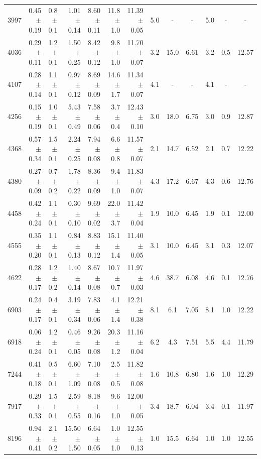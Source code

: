 \begin{table}
{\begin{tabular}{|r |r |r |r r |r r |c c c |c c c|}
 3997 & 0.45 $\pm$ 0.19 & 0.8 $\pm$ 0.1 &  1.01 $\pm$ 0.14 & 8.60 $\pm$ 0.11 & 11.8 $\pm$ 1.0 & 11.39 $\pm$ 0.05 & 5.0 &    - &    - & 5.0 &    - &     - \\
 4036 & 0.29 $\pm$ 0.11 & 1.2 $\pm$ 0.1 &  1.50 $\pm$ 0.25 & 8.42 $\pm$ 0.12 &  9.8 $\pm$ 1.0 & 11.70 $\pm$ 0.07 & 3.2 & 15.0 & 6.61 & 3.2 &  0.5 & 12.57 \\
 4107 & 0.28 $\pm$ 0.14 & 1.1 $\pm$ 0.1 &  0.97 $\pm$ 0.12 & 8.69 $\pm$ 0.09 & 14.6 $\pm$ 1.7 & 11.34 $\pm$ 0.07 & 4.1 &    - &    - & 4.1 &    - &     - \\
 4256 & 0.15 $\pm$ 0.19 & 1.0 $\pm$ 0.1 &  5.43 $\pm$ 0.49 & 7.58 $\pm$ 0.06 &  3.7 $\pm$ 0.4 & 12.43 $\pm$ 0.10 & 3.0 & 18.0 & 6.75 & 3.0 &  0.9 & 12.87 \\
 4368 & 0.57 $\pm$ 0.34 & 1.5 $\pm$ 0.1 &  2.24 $\pm$ 0.25 & 7.94 $\pm$ 0.08 &  6.6 $\pm$ 0.8 & 11.57 $\pm$ 0.07 & 2.1 & 14.7 & 6.52 & 2.1 &  0.7 & 12.22 \\
 4380 & 0.27 $\pm$ 0.09 & 0.7 $\pm$ 0.2 &  1.78 $\pm$ 0.22 & 8.36 $\pm$ 0.09 &  9.4 $\pm$ 1.0 & 11.83 $\pm$ 0.07 & 4.3 & 17.2 & 6.67 & 4.3 &  0.6 & 12.76 \\
 4458 & 0.42 $\pm$ 0.24 & 1.1 $\pm$ 0.1 &  0.30 $\pm$ 0.10 & 9.69 $\pm$ 0.02 & 22.0 $\pm$ 3.7 & 11.42 $\pm$ 0.04 & 1.9 & 10.0 & 6.45 & 1.9 &  0.1 & 12.00 \\
 4555 & 0.35 $\pm$ 0.20 & 1.1 $\pm$ 0.1 &  0.84 $\pm$ 0.13 & 8.83 $\pm$ 0.12 & 15.1 $\pm$ 1.4 & 11.40 $\pm$ 0.05 & 3.1 & 10.0 & 6.45 & 3.1 &  0.3 & 12.07 \\
 4622 & 0.28 $\pm$ 0.17 & 1.2 $\pm$ 0.2 &  1.40 $\pm$ 0.14 & 8.67 $\pm$ 0.08 & 10.7 $\pm$ 0.7 & 11.97 $\pm$ 0.03 & 4.6 & 38.7 & 6.08 & 4.6 &  0.1 & 12.76 \\
 6903 & 0.24 $\pm$ 0.17 & 0.4 $\pm$ 0.1 &  3.19 $\pm$ 0.34 & 7.83 $\pm$ 0.06 &  4.1 $\pm$ 1.4 & 12.21 $\pm$ 0.38 & 8.1 &  6.1 & 7.05 & 8.1 &  1.0 & 12.22 \\
 6918 & 0.06 $\pm$ 0.24 & 1.2 $\pm$ 0.1 &  0.46 $\pm$ 0.05 & 9.26 $\pm$ 0.08 & 20.3 $\pm$ 1.2 & 11.16 $\pm$ 0.04 & 6.2 &  4.3 & 7.51 & 5.5 &  4.4 & 11.79 \\
 7244 & 0.41 $\pm$ 0.18 & 0.5 $\pm$ 0.1 &  6.60 $\pm$ 1.09 & 7.10 $\pm$ 0.08 &  2.5 $\pm$ 0.5 & 11.82 $\pm$ 0.08 & 1.6 & 10.8 & 6.80 & 1.6 &  1.0 & 12.29 \\
 7917 & 0.29 $\pm$ 0.33 & 1.5 $\pm$ 0.1 &  2.59 $\pm$ 0.55 & 8.18 $\pm$ 0.16 &  9.6 $\pm$ 1.0 & 12.00 $\pm$ 0.05 & 3.4 & 18.7 & 6.04 & 3.4 &  0.1 & 11.97 \\
 8196 & 0.94 $\pm$ 0.41 & 2.1 $\pm$ 0.2 & 15.50 $\pm$ 1.50 & 6.64 $\pm$ 0.05 &  1.0 $\pm$ 1.0 & 12.55 $\pm$ 0.13 & 1.0 & 15.5 & 6.64 & 1.0 &  1.0 & 12.55 \\

\end{tabular}}
\end{table}
